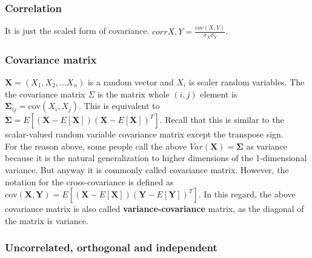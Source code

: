 \documentclass[11pt]{article}
\begin{document}
    \subsubsection{Correlation}\label{correlation}

It is just the scaled form of covariance.
\(corr{X,Y} = \frac{cov(X,Y)}{\sigma_X\sigma_Y}\).

    \subsubsection{Covariance matrix}\label{covariance-matrix}

\(\mathbf{X} = (X_1,X_2,...X_n)\) is a random vector and \(X_i\) is
scaler random variables. The the covariance matrix \(\Sigma\) is the
matrix whole \((i,j)\) element is
\(\mathbf{\Sigma}_{ij} = \mathrm{cov}(X_i,X_j)\). This is equivalent to
\(\mathbf{\Sigma} = E[(\mathbf{X}-E[\mathbf{X}])(\mathbf{X}-E[\mathbf{X}])^T]\).
Recall that this is similar to the scalar-valued random variable
covariance matrix except the transpose sign.\\
For the reason above, some people call the above
\(Var(\mathbf{X}) = \mathbf{\Sigma}\) as variance because it is the
natural generalization to higher dimensions of the 1-dimensional
variance. But anyway it is commonly called covariance matrix. However,
the notation for the cross-covariance is defined as
\(\mathrm{cov}(\mathbf{X,Y}) = E[(\mathbf{X}-E[\mathbf{X}])(\mathbf{Y}-E[\mathbf{Y}])^T]\).
In this regard, the above covariance matrix is also called
\textbf{variance-covariance} matrix, as the diagonal of the matrix is
variance.

    \subsubsection{Uncorrelated, orthogonal and
independent}\label{uncorrelated-orthogonal-and-independent}
\end{document}
